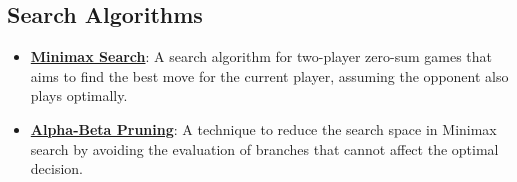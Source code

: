 \documentclass{article}%
\begin{document}
%
\subsection{Search Algorithms}%
\label{subsec:SearchAlgorithms}%
\begin{itemize}[leftmargin=*]%
\item \href{\url{https://purdue.brightspace.com/d2l/common/assets/pdfjs-d2l-dist/1.0.14-legacy/web/viewer.html?file=\%252Fcontent\%252Fenforced\%252F1095467-wl.202510.CS.24300.001\%252F02L2-Intro.pdf\%253Fou\%253D1095467\&lang=en-us\&container=d2l-fileviewer-rendered-pdf\&fullscreen=d2l-fileviewer-rendered-pdf-dialog\&height=667}#page=22}{\textbf{Minimax Search}}: A search algorithm for two-player zero-sum games that aims to find the best move for the current player, assuming the opponent also plays optimally.%
\item \href{\url{https://purdue.brightspace.com/d2l/common/assets/pdfjs-d2l-dist/1.0.14-legacy/web/viewer.html?file=\%252Fcontent\%252Fenforced\%252F1095467-wl.202510.CS.24300.001\%252F02L2-Intro.pdf\%253Fou\%253D1095467\&lang=en-us\&container=d2l-fileviewer-rendered-pdf\&fullscreen=d2l-fileviewer-rendered-pdf-dialog\&height=667}#page=23}{\textbf{Alpha-Beta Pruning}}: A technique to reduce the search space in Minimax search by avoiding the evaluation of branches that cannot affect the optimal decision.%
\end{itemize}

%
\end{document}

